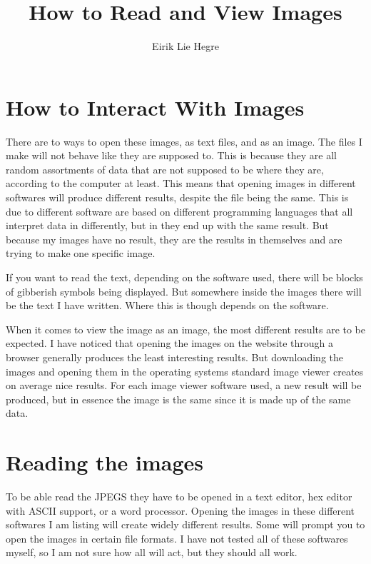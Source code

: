 \documentclass[12pt, letterpaper]{article}
\title{How to Read and View Images}
\author{Eirik Lie Hegre}
\begin{document}
\maketitle

\tableofcontents

\newpage

\section{How to Interact With Images}
There are to ways to open these images, as text files, and as an image. The
files I make will not behave like they are supposed to. This is because they are
all random assortments of data that are not supposed to be where they are,
according to the computer at least. This means that opening images in different
softwares will produce different results, despite the file being the same. This
is due to different software are based on different programming languages that
all interpret data in differently, but in they end up with the same result. But
because my images have no result, they are the results in themselves and are
trying to make one specific image. \par
If you want to read the text, depending on the software used, there will be
blocks of gibberish symbols being displayed. But somewhere inside the images
there will be the text I have written. Where this is though depends on the
software. \par
When it comes to view the image as an image, the most different results are to
be expected. I have noticed that opening the images on the website through a
browser generally produces the least interesting results. But downloading the
images and opening them in the operating systems standard image viewer creates
on average nice results. For each image viewer software used, a new result will
be produced, but in essence the image is the same since it is made up of the
same data.

\section{Reading the images}
\noindent To be able read the JPEGS they have to be opened in a text editor, hex
editor with ASCII support, or a word processor. Opening the images in these
different softwares I am listing will create widely different results. Some will
prompt you to open the images in certain file formats. I have not tested all of
these softwares myself, so I am not sure how all will act, but they should all
work. \bigskip
\end{document}
